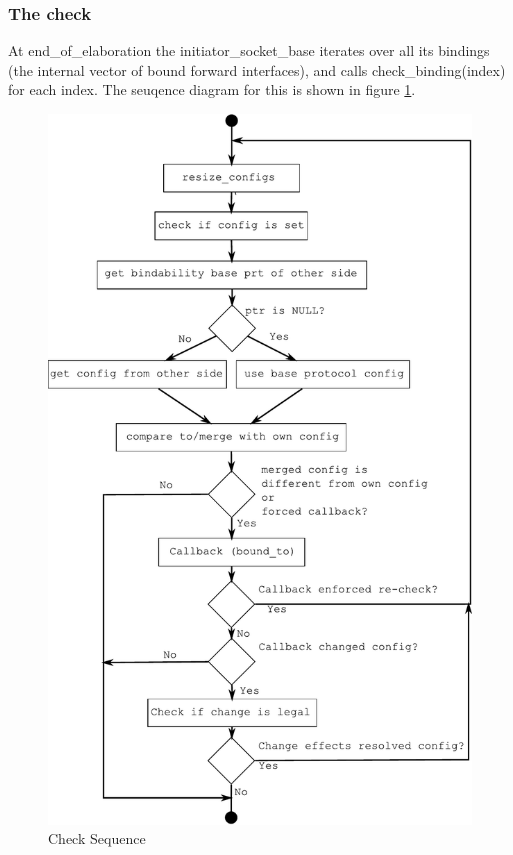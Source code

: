 \documentclass[a4paper,10pt]{article}          %
\newcommand{\code}[1]{{\ttfamily#1}}
\begin{document}
\subsubsection{The check}

At \code{end\_of\_elaboration} the \code{initiator\_socket\_base} iterates over all its bindings (the internal vector of bound forward interfaces), and calls \code{check\_binding(index)} for each index. The seuqence diagram for this is shown in figure \ref{fig:checksq}.

\begin{figure}[htbp]
\begin{center}
\includegraphics[scale=0.5]{checksq}
\caption{Check Sequence}
\label{fig:checksq}
\end{center}
\end{figure}
\end{document}
